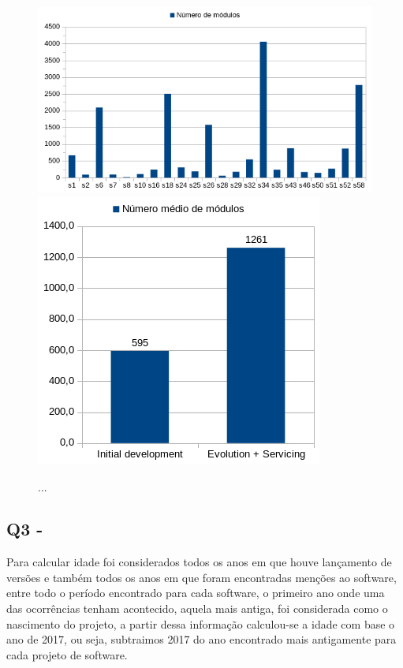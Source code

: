 \begin{figure}[h]
  \center
  \includegraphics[scale=0.6]{imagens/modules-total.png}
  \includegraphics[scale=0.6]{imagens/modules-average.png}
  \caption{...}
  \label{modules-average}
\end{figure}

\subsection{Q3 - \QuestaoTres} %

Para calcular idade foi considerados todos os anos em que houve lançamento
de versões e também todos os anos em que foram encontradas menções ao software,
entre todo o período encontrado para cada software, o primeiro ano onde uma
das ocorrências tenham acontecido, aquela mais antiga, foi considerada como
o nascimento do projeto, a partir dessa informação calculou-se a idade com
base o ano de 2017, ou seja, subtraimos 2017 do ano encontrado mais antigamente
para cada projeto de software.

